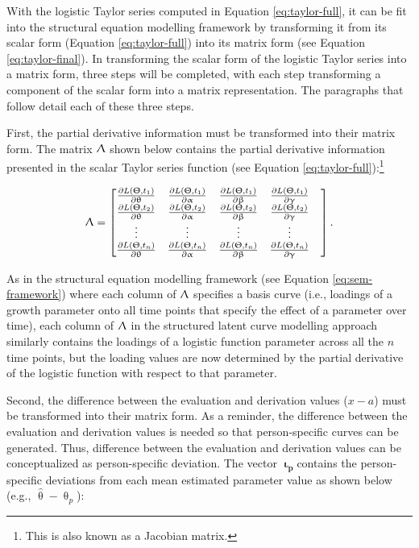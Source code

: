 \documentclass[
12pt, %
twoside,
english]{guelphthesis}
\begin{document}
With the logistic Taylor series computed in Equation \ref{eq:taylor-full}, it can be fit into the structural equation modelling framework by transforming it from its scalar form (Equation \ref{eq:taylor-full}) into its matrix form (see Equation \ref{eq:taylor-final}). In transforming the scalar form of the logistic Taylor series into a matrix form, three steps will be completed, with each step transforming a component of the scalar form into a matrix representation. The paragraphs that follow detail each of these three steps.

First, the partial derivative information must be transformed into their matrix form. The matrix \(\mathbf{\Uplambda}\) shown below contains the partial derivative information presented in the scalar Taylor series function (see Equation \ref{eq:taylor-full}):\footnote{This is also known as a Jacobian matrix.}

\[ 
\mathbf{\Uplambda} = 
\begin{bmatrix}
\frac{\partial L(\Uptheta, t_1)}{\partial \uptheta} & \frac{\partial L(\Uptheta, t_1)}{\partial \upalpha}  &  \frac{\partial L(\Uptheta, t_1)}{\partial \upbeta} & \frac{\partial L(\Uptheta, t_1)}{\partial \upgamma}   \\ 
\frac{\partial L(\Uptheta, t_2)}{\partial \uptheta}  & \frac{\partial L(\Uptheta, t_2)}{\partial \upalpha} &  \frac{\partial L(\Uptheta, t_2)}{\partial \upbeta} & \frac{\partial L(\Uptheta, t_2)}{\partial \upgamma} & \\ 
\vdots & \vdots & \vdots & \vdots \\ 
\frac{\partial L(\Uptheta, t_n)}{\partial \uptheta} & \frac{\partial L(\Uptheta, t_n)}{\partial \upalpha}  & \frac{\partial L(\Uptheta, t_n)}{\partial \upbeta} & \frac{\partial L(\Uptheta, t_n)}{\partial \upgamma} \\
\end{bmatrix}.
\]

\noindent As in the structural equation modelling framework (see Equation \ref{eq:sem-framework}) where each column of \(\mathbf{\Uplambda}\) specifies a basis curve (i.e., loadings of a growth parameter onto all time points that specify the effect of a parameter over time), each column of \(\mathbf{\Uplambda}\) in the structured latent curve modelling approach similarly contains the loadings of a logistic function parameter across all the \(n\) time points, but the loading values are now determined by the partial derivative of the logistic function with respect to that parameter.

Second, the difference between the evaluation and derivation values (\(x - a\)) must be transformed into their matrix form. As a reminder, the difference between the evaluation and derivation values is needed so that person-specific curves can be generated. Thus, difference between the evaluation and derivation values can be conceptualized as person-specific deviation. The vector \(\mathbf{\upiota_p}\)contains the person-specific deviations from each mean estimated parameter value as shown below (e.g., \(\hat{\uptheta} - \uptheta_p\)):
\end{document}
